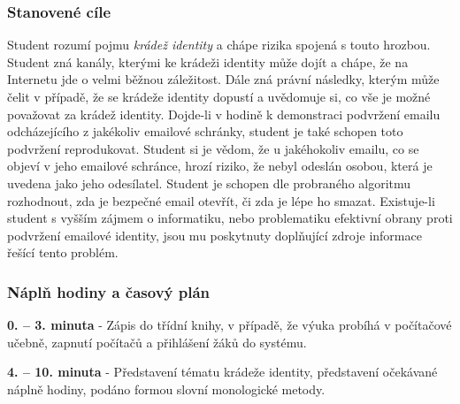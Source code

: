 \documentclass[a4paper, 12pt]{article}
\begin{document}
\subsubsection{Stanovené cíle}
Student rozumí pojmu \textit{krádež identity} a chápe rizika spojená s touto hrozbou. Student zná kanály, kterými ke krádeži identity může dojít a chápe, že na Internetu jde o velmi běžnou záležitost. Dále zná právní následky, kterým může čelit v případě, že se krádeže identity dopustí a uvědomuje si, co vše je možné považovat za krádež identity. Dojde-li v hodině k demonstraci podvržení emailu odcházejícího z jakékoliv emailové schránky, student je také schopen toto podvržení reprodukovat. Student si je vědom, že u jakéhokoliv emailu, co se objeví v jeho emailové schránce, hrozí riziko, že nebyl odeslán osobou, která je uvedena jako jeho odesílatel. Student je schopen dle probraného algoritmu rozhodnout, zda je bezpečné email otevřít, či zda je lépe ho smazat. Existuje-li student s vyšším zájmem o informatiku, nebo problematiku efektivní obrany proti podvržení emailové identity, jsou mu poskytnuty doplňující zdroje informace řešící tento problém.

\subsubsection{Náplň hodiny a časový plán}
\indent\textbf{0. -- 3. minuta} - Zápis do třídní knihy, v případě, že výuka probíhá v počítačové učebně, zapnutí počítačů a přihlášení žáků do systému.

\textbf{4. -- 10. minuta} - Představení tématu krádeže identity, představení očekávané náplně hodiny, podáno formou slovní monologické metody.
\end{document}

